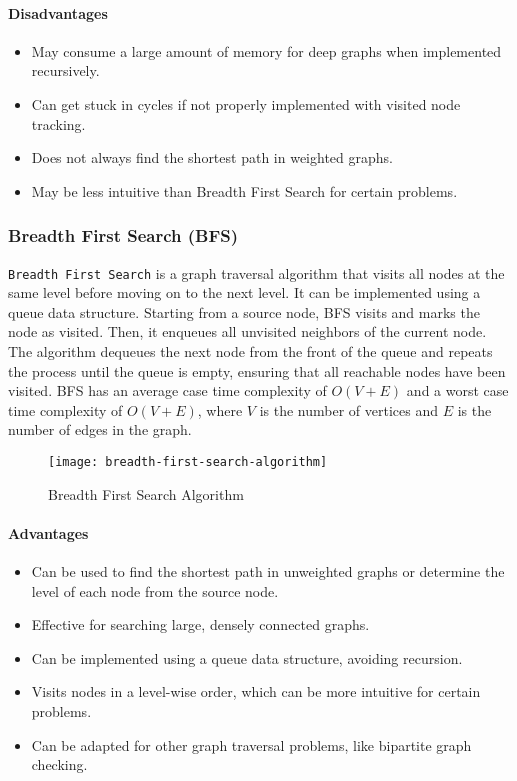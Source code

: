 \paragraph{Disadvantages}
\begin{itemize}
    \item May consume a large amount of memory for deep graphs when implemented recursively.
    \item Can get stuck in cycles if not properly implemented with visited node tracking.
    \item Does not always find the shortest path in weighted graphs.
    \item May be less intuitive than Breadth First Search for certain problems.
\end{itemize}

\subsubsection{Breadth First Search (BFS)}
\lstinline{Breadth First Search} is a graph traversal algorithm that visits all nodes at the same level before moving on to the next level. It can be implemented using a queue data structure. Starting from a source node, BFS visits and marks the node as visited. Then, it enqueues all unvisited neighbors of the current node. The algorithm dequeues the next node from the front of the queue and repeats the process until the queue is empty, ensuring that all reachable nodes have been visited. BFS has an average case time complexity of $O(V + E)$ and a worst case time complexity of $O(V + E)$, where $V$ is the number of vertices and $E$ is the number of edges in the graph.

\begin{figure}[!htbp]
    \centering
    \texttt{[image: breadth-first-search-algorithm]}
    \caption{Breadth First Search Algorithm \cite{zaltsman_dfs_bfs}}
    \label{fig:breadth-first-search-algorithm}
\end{figure}

\paragraph{Advantages}
\begin{itemize}
    \item Can be used to find the shortest path in unweighted graphs or determine the level of each node from the source node.
    \item Effective for searching large, densely connected graphs.
    \item Can be implemented using a queue data structure, avoiding recursion.
    \item Visits nodes in a level-wise order, which can be more intuitive for certain problems.
    \item Can be adapted for other graph traversal problems, like bipartite graph checking.
\end{itemize}
